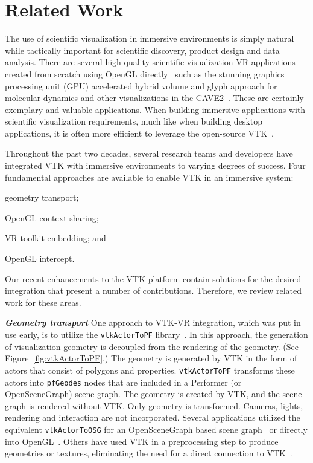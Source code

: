 \section{Related Work}

The use of scientific visualization in immersive environments is simply natural while tactically important for scientific discovery, product design and data analysis.
There are several high-quality scientific visualization VR applications created from scratch using OpenGL directly~\cite{Billen:2008, LaViola:2007, Schulze:2001, Rantzau:1998} such as the stunning graphics processing unit (GPU) accelerated hybrid volume and glyph approach for molecular dynamics and other visualizations in the CAVE2\texttrademark~\cite{Reda:2013, Reda:2013a}.
These are certainly exemplary and valuable applications.
When building immersive applications with scientific visualization requirements, much like when building desktop applications, it is often more efficient to leverage the open-source VTK~\cite{Schroeder:2004}.

Throughout the past two decades, several research teams and developers have integrated VTK with immersive environments to varying degrees of success.
Four fundamental approaches are available to enable VTK in an immersive system:

\begin{compactitem}
\item geometry transport;
\item OpenGL context sharing;
\item VR toolkit embedding; and
\item OpenGL intercept.
\end{compactitem}

Our recent enhancements to the VTK platform contain solutions for the desired integration that present a number of contributions. Therefore, we review related work for these areas.

\textbf{\textit{Geometry transport}}
One approach to VTK-VR integration, which was put in use early, is to utilize the \texttt{vtkActorToPF} library~\cite{Leigh98limbo/vtk}.
In this approach, the generation of visualization geometry is decoupled from
the rendering of the geometry. (See Figure~\ref{fig:vtkActorToPF}.) 
The geometry is generated by VTK in the form of actors that consist of polygons and properties.
\texttt{vtkActorToPF} transforms these actors into \texttt{pfGeodes} nodes that are included in a Performer (or OpenSceneGraph) scene graph. The geometry is created by VTK, and the scene graph is rendered without VTK. Only geometry is transformed. Cameras, lights, rendering and interaction are not incorporated. Several applications utilized the equivalent \texttt{vtkActorToOSG} for an OpenSceneGraph based scene graph~\cite{VE-Suite:2016} or directly into OpenGL~\cite{Ohno:2006}. Others have used VTK in a preprocessing step to produce geometries or textures, eliminating the need for a direct connection to VTK~\cite{Bivins:2005}.

